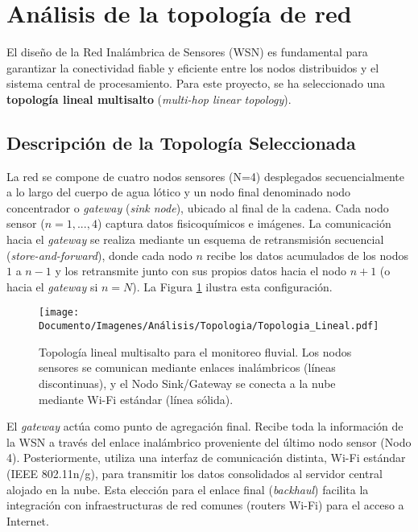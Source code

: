 \section{Análisis de la topología de red}


El diseño de la Red Inalámbrica de Sensores (WSN) es fundamental para garantizar la conectividad fiable y eficiente entre los nodos distribuidos y el sistema central de procesamiento. Para este proyecto, se ha seleccionado una \textbf{topología lineal multisalto} (\textit{multi-hop linear topology}).

\subsection{Descripción de la Topología Seleccionada}
\label{subsec:descripcion_topologia}

La red se compone de cuatro nodos sensores (N=4) desplegados secuencialmente a lo largo del cuerpo de agua lótico y un nodo final denominado nodo concentrador o \textit{gateway} (\textit{sink node}), ubicado al final de la cadena. Cada nodo sensor ($n=1, ..., 4$) captura datos fisicoquímicos e imágenes. La comunicación hacia el \textit{gateway} se realiza mediante un esquema de retransmisión secuencial (\textit{store-and-forward}), donde cada nodo $n$ recibe los datos acumulados de los nodos $1$ a $n-1$ y los retransmite junto con sus propios datos hacia el nodo $n+1$ (o hacia el \textit{gateway} si $n=N$). La Figura \ref{fig:topologia_lineal_fluvial} ilustra esta configuración.

\begin{figure}[H]
   \centering
   \texttt{[image: Documento/Imagenes/Análisis/Topologia/Topologia\_Lineal.pdf]}
   \caption{Topología lineal multisalto para el monitoreo fluvial. Los nodos sensores se comunican mediante enlaces inalámbricos (líneas discontinuas), y el Nodo Sink/Gateway se conecta a la nube mediante Wi-Fi estándar (línea sólida).}
   \label{fig:topologia_lineal_fluvial}
\end{figure}

El \textit{gateway} actúa como punto de agregación final. Recibe toda la información de la WSN a través del enlace inalámbrico proveniente del último nodo sensor (Nodo 4). Posteriormente, utiliza una interfaz de comunicación distinta, Wi-Fi estándar (IEEE 802.11n/g), para transmitir los datos consolidados al servidor central alojado en la nube. Esta elección para el enlace final (\textit{backhaul}) facilita la integración con infraestructuras de red comunes (routers Wi-Fi) para el acceso a Internet.


